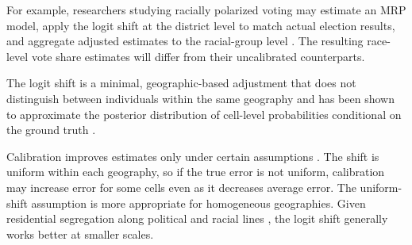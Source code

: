 For example, researchers studying racially polarized voting may estimate an MRP model, apply the logit shift at the district level to match actual election results, and aggregate adjusted estimates to the racial-group level \citep{Kuriwaki2023}. The resulting race-level vote share estimates will differ from their uncalibrated counterparts.

The logit shift is a minimal, geographic-based adjustment that does not distinguish between individuals within the same geography and has been shown to approximate the posterior distribution of cell-level probabilities conditional on the ground truth \citep{RMO:2023}.



Calibration improves estimates only under certain assumptions \citep[section 3]{RMO:2023}. The shift is uniform within each geography, so if the true error is not uniform, calibration may increase error for some cells even as it decreases average error.
The uniform-shift assumption is more appropriate for homogeneous geographies. Given residential segregation along political and racial lines \citep{Rodden2019}, the logit shift generally works better at smaller scales.